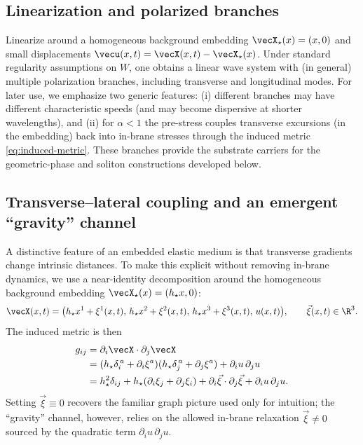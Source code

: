 \subsection{Linearization and polarized branches}

Linearize around a homogeneous background embedding $\vecX_\star(x)=(x,0)$ and small displacements
$\vecu(x,t)=\vecX(x,t)-\vecX_\star(x)$.
Under standard regularity assumptions on $W$, one obtains a linear wave system with (in general) multiple
polarization branches, including transverse and longitudinal modes.
For later use, we emphasize two generic features:
(i) different branches may have different characteristic speeds (and may become dispersive at shorter wavelengths),
and (ii) for $\alpha<1$ the pre-stress couples transverse excursions (in the embedding) back into in-brane stresses
through the induced metric \eqref{eq:induced-metric}.
These branches provide the substrate carriers for the geometric-phase and soliton constructions developed below.

\subsection{Transverse--lateral coupling and an emergent ``gravity'' channel}
\label{subsec:gravity-channel}

A distinctive feature of an embedded elastic medium is that transverse gradients change intrinsic distances.
To make this explicit without removing in-brane dynamics, we use a near-identity decomposition around the
homogeneous background embedding $\vecX_\star(x)=(h_\star x,0)$:
\begin{equation}
  \vecX(x,t)=\big(h_\star x^1+\xi^1(x,t),\,h_\star x^2+\xi^2(x,t),\,h_\star x^3+\xi^3(x,t),\,u(x,t)\big),
  \qquad \vec\xi(x,t)\in\R^3.
  \label{eq:near-identity-embedding}
\end{equation}
The induced metric is then
\begin{align}
  g_{ij}
  &= \partial_i\vecX\cdot\partial_j\vecX \nonumber\\
  &= (h_\star\delta_i^{\,a}+\partial_i\xi^a)(h_\star\delta_j^{\,a}+\partial_j\xi^a)+\partial_i u\,\partial_j u \nonumber\\
  &= h_\star^2\delta_{ij}+h_\star(\partial_i\xi_j+\partial_j\xi_i)+\partial_i\vec\xi\cdot\partial_j\vec\xi+\partial_i u\,\partial_j u.
  \label{eq:metric-near-identity}
\end{align}
Setting $\vec\xi\equiv 0$ recovers the familiar graph picture used only for intuition; the ``gravity'' channel,
however, relies on the allowed in-brane relaxation $\vec\xi\neq 0$ sourced by the quadratic term
$\partial_i u\,\partial_j u$.

